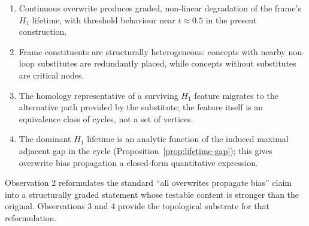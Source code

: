 \documentclass[12pt]{article}
\begin{document}
\begin{enumerate}[noitemsep]
\item Continuous overwrite produces graded, non-linear degradation
  of the frame's $H_1$ lifetime, with threshold behaviour near
  $t \approx 0.5$ in the present construction.
\item Frame constituents are structurally heterogeneous: concepts
  with nearby non-loop substitutes are redundantly placed, while
  concepts without substitutes are critical nodes.
\item The homology representative of a surviving $H_1$ feature
  migrates to the alternative path provided by the substitute; the
  feature itself is an equivalence class of cycles, not a set of
  vertices.
\item The dominant $H_1$ lifetime is an analytic function of the
  induced maximal adjacent gap in the cycle
  (Proposition~\ref{prop:lifetime-gap}); this gives overwrite bias
  propagation a closed-form quantitative expression.
\end{enumerate}

Observation 2 reformulates the standard ``all overwrites propagate
bias'' claim into a structurally graded statement whose testable
content is stronger than the original. Observations 3 and 4 provide
the topological substrate for that reformulation.

\end{document}
